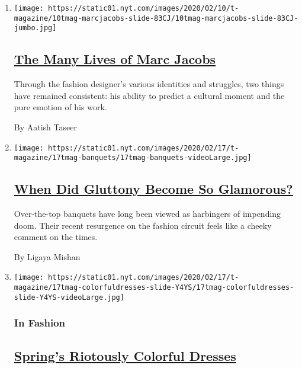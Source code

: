 \begin{enumerate}
\def\labelenumi{\arabic{enumi}.}
\item
  \texttt{[image: https://static01.nyt.com/images/2020/02/10/t-magazine/10tmag-marcjacobs-slide-83CJ/10tmag-marcjacobs-slide-83CJ-jumbo.jpg]}

  \hypertarget{the-many-lives-of-marc-jacobs}{%
  \subsection{\texorpdfstring{\href{/2020/02/10/t-magazine/marc-jacobs.html}{The
  Many Lives of Marc
  Jacobs}}{The Many Lives of Marc Jacobs}}\label{the-many-lives-of-marc-jacobs}}

  Through the fashion designer's various identities and struggles, two
  things have remained consistent: his ability to predict a cultural
  moment and the pure emotion of his work.

  By Aatish Taseer
\item
  \texttt{[image: https://static01.nyt.com/images/2020/02/17/t-magazine/17tmag-banquets/17tmag-banquets-videoLarge.jpg]}

  \hypertarget{when-did-gluttony-become-so-glamorous}{%
  \subsection{\texorpdfstring{\href{/2020/02/21/t-magazine/fashion-banquets.html}{When
  Did Gluttony Become So
  Glamorous?}}{When Did Gluttony Become So Glamorous?}}\label{when-did-gluttony-become-so-glamorous}}

  Over-the-top banquets have long been viewed as harbingers of impending
  doom. Their recent resurgence on the fashion circuit feels like a
  cheeky comment on the times.

  By Ligaya Mishan
\item
  \texttt{[image: https://static01.nyt.com/images/2020/02/17/t-magazine/17tmag-colorfuldresses-slide-Y4YS/17tmag-colorfuldresses-slide-Y4YS-videoLarge.jpg]}

  \hypertarget{in-fashion}{%
  \subsubsection{In Fashion}\label{in-fashion}}

  \hypertarget{springs-riotously-colorful-dresses}{%
  \subsection{\texorpdfstring{\href{/2020/02/17/t-magazine/spring-colorful-dresses.html}{Spring's
  Riotously Colorful
  Dresses}}{Spring's Riotously Colorful Dresses}}\label{springs-riotously-colorful-dresses}}


\end{enumerate}
